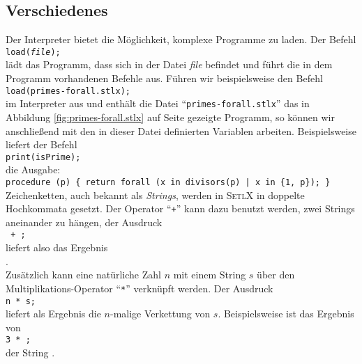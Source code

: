 \subsection{Verschiedenes}
Der Interpreter bietet die Möglichkeit, komplexe Programme zu laden.  Der Befehl
\\[0.2cm]
\hspace*{1.3cm}
\texttt{load(\textsl{file});}
\\[0.2cm]
lädt das Programm, dass sich in der Datei \textsl{file} befindet und führt die in dem
Programm vorhandenen Befehle aus.  Führen wir beispielsweise den Befehl
\\[0.2cm]
\hspace*{1.3cm}
\texttt{load(primes-forall.stlx);}
\\[0.2cm]
im Interpreter aus und enthält die Datei ``\texttt{primes-forall.stlx}'' das in Abbildung
\ref{fig:primes-forall.stlx} auf Seite \pageref{fig:primes-forall.stlx} gezeigte Programm,
so können wir anschließend mit den in dieser Datei definierten Variablen arbeiten.
Beispielsweise liefert der Befehl
\\[0.2cm]
\hspace*{1.3cm}
\texttt{print(isPrime);}
\\[0.2cm]
die Ausgabe:
\\[0.2cm]
\hspace*{1.3cm}
\texttt{procedure (p) \{ return forall (x in divisors(p) | x in \{1, p\}); \}}
\\[0.2cm]
Zeichenketten, auch bekannt als \emph{Strings}, werden in \textsc{SetlX} in doppelte
Hochkommata gesetzt.  Der Operator ``\texttt{+}'' kann dazu benutzt werden, zwei Strings
aneinander zu hängen, der Ausdruck 
\\[0.2cm]
\hspace*{1.3cm}
\texttt{ + ;}
\\[0.2cm]
liefert also das Ergebnis
\\[0.2cm]
\hspace*{1.3cm}
.
\\[0.2cm]
Zusätzlich kann eine natürliche Zahl $n$ mit einem String $s$ über den
Multiplikations-Operator ``\texttt{*}'' verknüpft werden.  Der Ausdruck 
\\[0.2cm]
\hspace*{1.3cm}
\texttt{n * s;}
\\[0.2cm]
liefert als Ergebnis die $n$-malige Verkettung von $s$.  Beispielsweise ist das Ergebnis von
\\[0.2cm]
\hspace*{1.3cm}
\texttt{3 * ;}
\\[0.2cm]
der String .

